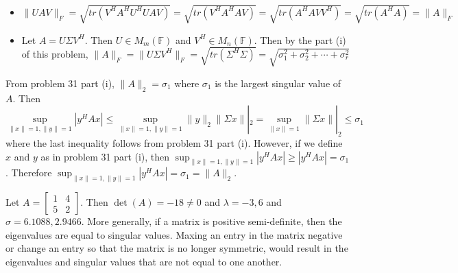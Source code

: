 \documentclass[12pt]{article}
\newcommand{\F}{\mathbb{F}}
\newenvironment{problem}[2][Problem]{\begin{trivlist}
\item[\hskip \labelsep {\bfseries #1}\hskip \labelsep {\bfseries #2}]}{\end{trivlist}}
\begin{document}
\begin{problem}{32.}\hfill
\begin{itemize}
\item [(i)] $\| UAV\|_F = \sqrt{tr(V^HA^HU^HUAV)} = \sqrt{tr(V^HA^HAV)} =  \sqrt{tr(A^HAVV^H)}  = \sqrt{tr(A^HA)} = \|A\|_F $ 
\item [(ii)] Let $A = U\Sigma V^H$. Then $U \in M_m(\F)$ and $V^H \in M_n(\F)$. Then by the part (i) of this problem, $\|A\|_F = \| U\Sigma V^H\|_F = \sqrt{tr(\Sigma^H\Sigma)}  = \sqrt{\sigma_1^2 + \sigma_2^2 + \cdots + \sigma_r^2}$
\end{itemize}
\end{problem}

\begin{problem}{33.} 
From problem 31 part (i), $\|A\|_2 = \sigma_1$ where $\sigma_1$ is the largest singular value of $A$. Then 
$$\sup_{\|x\| = 1, \|y\| = 1} |y^HAx| \leq \sup_{\|x\| = 1, \|y\| = 1} \|y\|_2 \| \Sigma x\||_2  = \sup_{\|x\| = 1}\| \Sigma x\||_2 \leq \sigma_1$$
where the last inequality follows from problem 31 part (i). 
However, if we define $x$ and $y$ as in problem 31 part (i), then $\sup_{\|x\| = 1, \|y\| = 1} |y^HAx| \geq |y^HAx| = \sigma_1$. Therefore  $\sup_{\|x\| = 1, \|y\| = 1} |y^HAx| = \sigma_1 = \|A\|_2$. 
\end{problem}

\begin{problem}{36.} 
Let $A = \begin{bmatrix}
         1 & 4 \\
         5 & 2
        \end{bmatrix}$. Then $\det(A) = -18 \neq 0$ and $\lambda = -3, 6$ and $\sigma =  6.1088,  2.9466$. More generally, if a matrix is positive semi-definite, then the eigenvalues are equal to singular values. Maxing an entry in the matrix negative or change an entry so that the matrix is no longer symmetric, would result in the eigenvalues and singular values that are not equal to one another. 
        
\end{problem}
\end{document}
